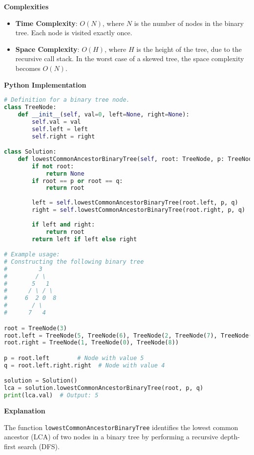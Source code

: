 \textbf{Complexities}

\begin{itemize}
    \item \textbf{Time Complexity}: \(O(N)\), where \(N\) is the number of nodes in the binary tree. Each node is visited exactly once.
    \item \textbf{Space Complexity}: \(O(H)\), where \(H\) is the height of the tree, due to the recursive call stack. In the worst case of a skewed tree, the space complexity becomes \(O(N)\).
\end{itemize}

\textbf{Python Implementation}

\begin{lstlisting}[language=Python, xleftmargin=0.02\textwidth, xrightmargin=0.02\textwidth]
# Definition for a binary tree node.
class TreeNode:
    def __init__(self, val=0, left=None, right=None):
        self.val = val
        self.left = left
        self.right = right

class Solution:
    def lowestCommonAncestorBinaryTree(self, root: TreeNode, p: TreeNode, q: TreeNode) -> TreeNode:
        if not root:
            return None
        if root == p or root == q:
            return root
        
        left = self.lowestCommonAncestorBinaryTree(root.left, p, q)
        right = self.lowestCommonAncestorBinaryTree(root.right, p, q)
        
        if left and right:
            return root
        return left if left else right

# Example usage:
# Constructing the following binary tree
#         3
#        / \
#       5   1
#      / \ / \
#     6  2 0  8
#       / \
#      7   4

root = TreeNode(3)
root.left = TreeNode(5, TreeNode(6), TreeNode(2, TreeNode(7), TreeNode(4)))
root.right = TreeNode(1, TreeNode(0), TreeNode(8))

p = root.left        # Node with value 5
q = root.left.right.right  # Node with value 4

solution = Solution()
lca = solution.lowestCommonAncestorBinaryTree(root, p, q)
print(lca.val)  # Output: 5
\end{lstlisting}

\textbf{Explanation}

The function \texttt{lowestCommonAncestorBinaryTree} identifies the lowest common ancestor (LCA) of two nodes in a binary tree by performing a recursive depth-first search (DFS). 

